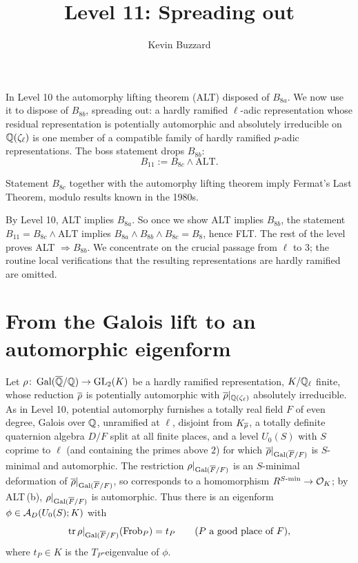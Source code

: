 \documentclass[11pt]{article}
\title{Level 11: Spreading out}
\author{Kevin Buzzard}
\date{}
\begin{document}
\maketitle

\noindent
In Level 10 the automorphy lifting theorem (ALT) disposed of $B_{8a}$. We now
use it to dispose of $B_{8b}$, spreading out: a hardly ramified $\ell$-adic
representation whose residual representation is potentially automorphic and
absolutely irreducible on $\mathbb{Q}(\zeta_\ell)$ is one member of a compatible family
of hardly ramified $p$-adic representations. The boss statement drops $B_{8b}$:
\[
  B_{11} := B_{8c}\wedge\text{ALT}.
\]

\begin{theorem}\label{thm:boss11}
Statement $B_{8c}$ together with the automorphy lifting theorem imply Fermat's
Last Theorem, modulo results known in the 1980s.
\end{theorem}

By Level 10, ALT implies $B_{8a}$. So once we show ALT implies $B_{8b}$, the
statement $B_{11}=B_{8c}\wedge\text{ALT}$ implies
$B_{8a}\wedge B_{8b}\wedge B_{8c}=B_8$, hence FLT. The rest of the level proves
ALT $\Rightarrow B_{8b}$. We concentrate on the crucial passage from $\ell$ to
$3$; the routine local verifications that the resulting representations are
hardly ramified are omitted.

\section{From the Galois lift to an automorphic eigenform}

Let $\rho\colon\operatorname{Gal}(\overline{\mathbb{Q}}/\mathbb{Q})\to\operatorname{GL}_2(K)$ be a hardly ramified representation, $K/\mathbb{Q}_\ell$
finite, whose reduction $\overline{\rho}$ is potentially automorphic with
$\overline{\rho}|_{\mathbb{Q}(\zeta_\ell)}$ absolutely irreducible. As in Level 10, potential
automorphy furnishes a totally real field $F$ of even degree, Galois over $\mathbb{Q}$,
unramified at $\ell$, disjoint from $K_{\overline{\rho}}$, a totally definite quaternion
algebra $D/F$ split at all finite places, and a level $U_0(S)$ with $S$ coprime to $\ell$ (and
containing the primes above $2$) for which $\overline{\rho}|_{\operatorname{Gal}(\overline{F}/F)}$ is $S$-minimal and
automorphic. The restriction $\rho|_{\operatorname{Gal}(\overline{F}/F)}$ is an $S$-minimal deformation of
$\overline{\rho}|_{\operatorname{Gal}(\overline{F}/F)}$, so corresponds to a homomorphism
$R^{S\text{-}\mathrm{min}}\to\mathcal{O}_K$; by ALT\,(b), $\rho|_{\operatorname{Gal}(\overline{F}/F)}$ is automorphic. Thus
there is an eigenform $\phi\in\mathcal{A}_D(U_0(S);K)$ with
\[
  \operatorname{tr}\rho|_{\operatorname{Gal}(\overline{F}/F)}(\operatorname{Frob}_P)=t_P\qquad(P\text{ a good place of }F),
\]
where $t_P\in K$ is the $T_P$-eigenvalue of $\phi$.
\end{document}
